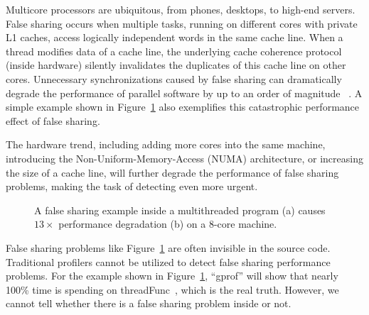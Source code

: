 Multicore processors are ubiquitous, from phones, desktops, to high-end servers.
False sharing occurs when multiple tasks, running on different cores with private L1 caches, access logically independent words in the same cache line. When a thread modifies data of a cache line, the underlying cache coherence protocol (inside hardware) silently invalidates the duplicates of this cache line on other cores. Unnecessary synchronizations caused by false sharing can dramatically degrade the performance of parallel software by up to an order of magnitude ~\cite{falseshare:effect}. A simple example shown in Figure~\ref{fig:penalty} also exemplifies this catastrophic performance effect of false sharing. 

The hardware trend, including adding more cores into the same machine, introducing the Non-Uniform-Memory-Access (NUMA) architecture, or increasing the size of a cache line, will further degrade the performance of false sharing problems, making the task of detecting even more urgent. 

\begin{figure}[htbp]
\centering
{}%
\hspace{30pt}
\caption{
A false sharing example inside a multithreaded program (a) causes $13\times$ performance degradation (b) on a 8-core machine.
\label{fig:penalty}}
\end{figure}

False sharing problems like Figure~\ref{fig:penalty} are often invisible in the source code. Traditional profilers cannot be utilized to detect false sharing performance problems. For the example shown in Figure~\ref{fig:penalty}, ``gprof'' will show that nearly 100\% time is spending on threadFunc~\cite{gprof}, which is the real truth. However, we cannot tell whether there is a false sharing problem inside or not.

